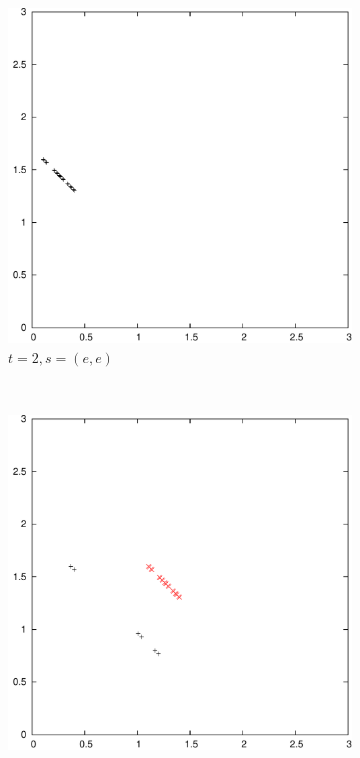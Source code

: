 \documentclass{article}
\begin{document}
	\begin{figure}
		\centering
		\begin{subfigure}[b]{0.3\textwidth}
			\centering
			\includegraphics[width=\textwidth]{images/t2s0}
			\caption{$t=2, s=(e,e)$}
			\label{fig:t2s0}
		\end{subfigure}
		~
		\begin{subfigure}[b]{0.3\textwidth}
			\centering
			\includegraphics[width=\textwidth]{images/t2s1}

\end{subfigure}
\end{figure}
\end{document}
